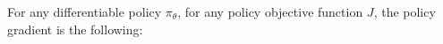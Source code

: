 \documentclass[preview]{standalone}
\begin{document}
\begin{center}
For any differentiable policy $\pi_{\theta}$, for any policy objective function $J$, the policy gradient is the following:
\end{center}
\end{document}
